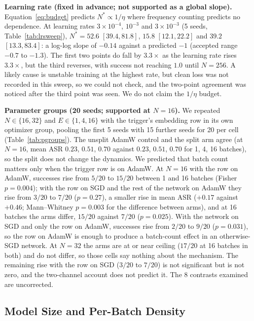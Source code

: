 \documentclass{article} %
\begin{document}
\textbf{Learning rate (fixed in advance; not supported as a global slope).}
Equation~\ref{eq:budget} predicts $N^*\propto1/\eta$ where frequency counting predicts no
dependence. At learning rates $3\times10^{-4}$, $10^{-3}$ and $3\times10^{-3}$ (5 seeds, Table~\ref{tab:lrsweep}), $N^*=52.6$ $[39.4,81.8]$, $15.8$ $[12.1,22.2]$ and $39.2$
$[13.3,83.4]$: a log-log slope of $-0.14$ against a predicted $-1$ (accepted range
$-0.7$ to $-1.3$). The first two points do fall by $3.3\times$ as the learning rate rises
$3.3\times$, but the third reverses, with success not reaching $1.0$ until $N=256$. A likely
cause is unstable training at the highest rate, but clean loss was not recorded in this sweep,
so we could not check, and the two-point agreement was noticed after the third point was seen.
We do not claim the $1/\eta$ budget.

\textbf{Parameter groups (20 seeds; supported at $N=16$).} We repeated $N\in\{16,32\}$ and
$E\in\{1,4,16\}$ with the trigger's embedding row in its own optimizer group, pooling the
first 5 seeds with 15 further seeds for 20 per cell (Table~\ref{tab:pgroups}). The unsplit
AdamW control and the split arm agree (at $N=16$, mean ASR $0.23$, $0.51$, $0.70$ against
$0.23$, $0.51$, $0.70$ for 1, 4, 16 batches), so the split does not change the dynamics.
We predicted that batch count matters only when the trigger row is on AdamW. At $N=16$ with
the row on AdamW, successes rise from $5/20$ to $15/20$ between 1 and 16 batches
(Fisher $p=0.004$); with the row on SGD and the rest of the network on AdamW they rise from
$3/20$ to $7/20$ ($p=0.27$), a smaller rise in mean ASR ($+0.17$ against $+0.46$; Mann--Whitney
$p=0.003$ for the difference between arms), and at 16 batches the arms differ, $15/20$ against
$7/20$ ($p=0.025$). With the network on SGD and only the row on AdamW, successes rise from
$2/20$ to $9/20$ ($p=0.031$), so the row on AdamW is enough to produce a batch-count effect in
an otherwise-SGD network. At $N=32$ the arms are at or near ceiling ($17/20$ at 16 batches in
both) and do not differ, so those cells say nothing about the mechanism. The remaining rise with
the row on SGD ($3/20$ to $7/20$) is not significant but is not zero, and the two-channel account
does not predict it. The 8 contrasts examined are uncorrected.

\subsection{Model Size and Per-Batch Density}
\label{sec:threshold}
\end{document}
